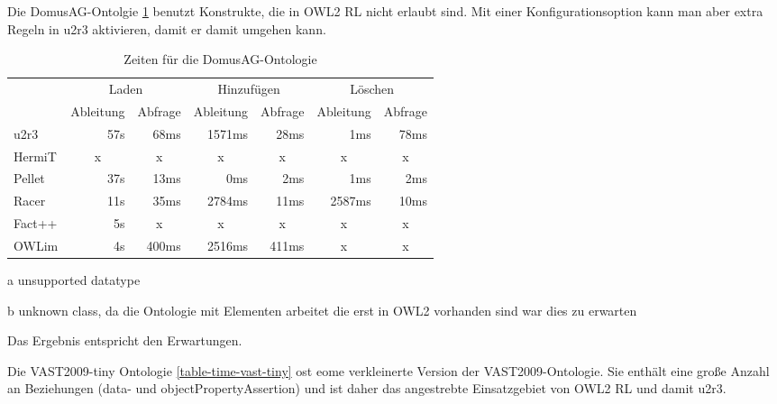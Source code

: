 Die DomusAG-Ontolgie \ref{table-time-domusag} benutzt Konstrukte, die in OWL2 RL nicht erlaubt sind. Mit einer Konfigurationsoption kann man aber extra Regeln in u2r3 aktivieren, damit er damit umgehen kann.
\begin{table}[htbp]
\caption{Zeiten für die DomusAG-Ontologie}
\label{table-time-domusag}
\begin{center}
\begin{threeparttable}
\begin{tabular}{l|r|r|r|r|r|r|}
\cline{2-7}
 & \multicolumn{2}{|c|}{Laden} & \multicolumn{2}{|c|}{Hinzufügen} & \multicolumn{2}{|c|}{Löschen} \\
\cline{2-7}
 & \multicolumn{1}{|c|}{Ableitung} & \multicolumn{1}{|c|}{Abfrage} & \multicolumn{1}{|c|}{Ableitung} & \multicolumn{1}{|c|}{Abfrage} & \multicolumn{1}{|c|}{Ableitung} & \multicolumn{1}{|c|}{Abfrage} \\
\hline
\multicolumn{1}{|l|}{u2r3} & 57s & 68ms & 1571ms & 28ms & 1ms & 78ms \\ \hline
\multicolumn{1}{|l|}{HermiT\tnote{a}} & \multicolumn{1}{c|}{x} & \multicolumn{1}{c|}{x} & \multicolumn{1}{c|}{x} & \multicolumn{1}{c|}{x} & \multicolumn{1}{c|}{x} & \multicolumn{1}{c|}{x} \\ \hline
\multicolumn{1}{|l|}{Pellet} & 37s & 13ms & 0ms & 2ms & 1ms & 2ms \\ \hline
\multicolumn{1}{|l|}{Racer} & 11s & 35ms & 2784ms & 11ms & 2587ms & 10ms \\ \hline
\multicolumn{1}{|l|}{Fact++\tnote{b}} & 5s & \multicolumn{1}{c|}{x} & \multicolumn{1}{c|}{x} & \multicolumn{1}{c|}{x} & \multicolumn{1}{c|}{x} & \multicolumn{1}{c|}{x} \\ \hline
\multicolumn{1}{|l|}{OWLim} & 4s & 400ms & 2516ms & 411ms & \multicolumn{1}{c|}{x} & \multicolumn{1}{c|}{x} \\ \hline
\end{tabular}
\begin{tablenotes}
	\item[a] unsupported datatype
	\item[b] unknown class, da die Ontologie mit Elementen arbeitet die erst in OWL2 vorhanden sind war dies zu erwarten
\end{tablenotes}
\end{threeparttable}
\end{center}
\end{table}
Das Ergebnis entspricht den Erwartungen.

Die VAST2009-tiny Ontologie \ref{table-time-vast-tiny} ost eome verkleinerte Version der VAST2009-Ontologie. Sie enthält eine große Anzahl an Beziehungen (data- und objectPropertyAssertion) und ist daher das angestrebte Einsatzgebiet von OWL2 RL und damit u2r3.

